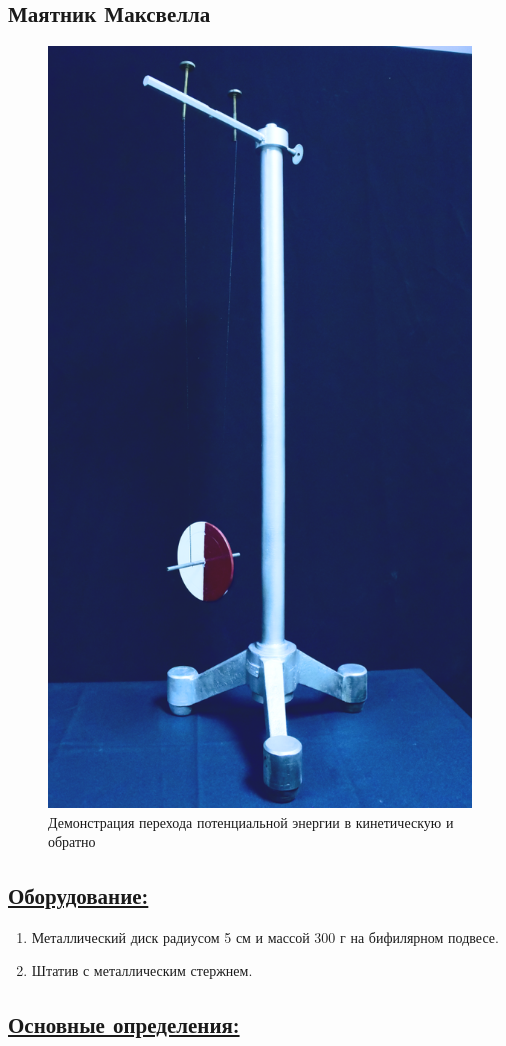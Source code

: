 \documentclass[14pt,a4paper,oneside]{extarticle}	%
\begin{document}
	
	
	\newpage
	\begin{center}
		\subsection*{Маятник Максвелла}
	\end{center}

\begin{figure}[H] 	
	\centering 	
	\includegraphics[width=0.35\linewidth]{Maxwell-1.png}
	\caption{Демонстрация перехода потенциальной энергии в кинетическую и обратно}
	\label{Maxwell-1}
\end{figure}

\subsection*{\underline{Оборудование:}}
\begin{enumerate}
	\item Металлический диск радиусом 5 см и массой 300 г на бифилярном подвесе.
	\item Штатив с металлическим стержнем.
\end{enumerate}
	
\subsection*{\underline{Основные определения:}}
		
\end{document}
